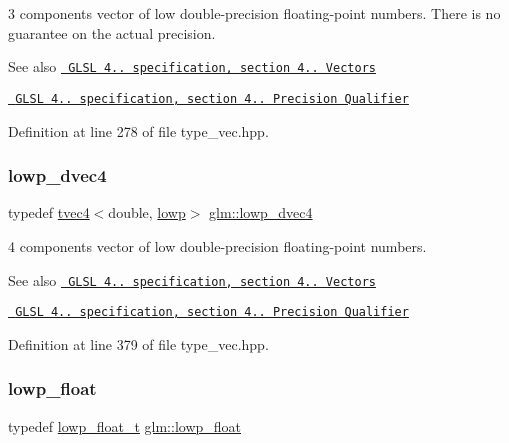 3 components vector of low double-\/precision floating-\/point numbers. There is no guarantee on the actual precision.

\begin{DoxySeeAlso}{See also}
\href{http://www.opengl.org/registry/doc/GLSLangSpec.4.20.8.pdf}{\texttt{ G\+L\+SL 4.. specification, section 4.. Vectors}} 

\href{http://www.opengl.org/registry/doc/GLSLangSpec.4.20.8.pdf}{\texttt{ G\+L\+SL 4.. specification, section 4.. Precision Qualifier}} 
\end{DoxySeeAlso}


Definition at line 278 of file type\+\_\+vec.\+hpp.

\mbox{\label{group__core__precision_gaed0097453a4f8b1f3dcf7476aee881cd}} 
\subsubsection{\texorpdfstring{lowp\_dvec4}{lowp\_dvec4}}
{\footnotesize\ttfamily typedef \mbox{\hyperlink{structglm_1_1tvec4}{tvec4}}$<$double, \mbox{\hyperlink{namespaceglm_a0f04f086094c747d227af4425893f545ae161af3fc695e696ce3bf69f7332bc2d}{lowp}}$>$ \mbox{\hyperlink{group__core__precision_gaed0097453a4f8b1f3dcf7476aee881cd}{glm\+::lowp\+\_\+dvec4}}}

4 components vector of low double-\/precision floating-\/point numbers.

\begin{DoxySeeAlso}{See also}
\href{http://www.opengl.org/registry/doc/GLSLangSpec.4.20.8.pdf}{\texttt{ G\+L\+SL 4.. specification, section 4.. Vectors}} 

\href{http://www.opengl.org/registry/doc/GLSLangSpec.4.20.8.pdf}{\texttt{ G\+L\+SL 4.. specification, section 4.. Precision Qualifier}} 
\end{DoxySeeAlso}


Definition at line 379 of file type\+\_\+vec.\+hpp.

\mbox{\label{group__core__precision_ga2887fbc729ac5c1c5caeb7cd57a7145c}} 
\subsubsection{\texorpdfstring{lowp\_float}{lowp\_float}}
{\footnotesize\ttfamily typedef \mbox{\hyperlink{namespaceglm_a0a43b64238afac063f27ee7620205bf2}{lowp\+\_\+float\+\_\+t}} \mbox{\hyperlink{group__core__precision_ga2887fbc729ac5c1c5caeb7cd57a7145c}{glm\+::lowp\+\_\+float}}}

